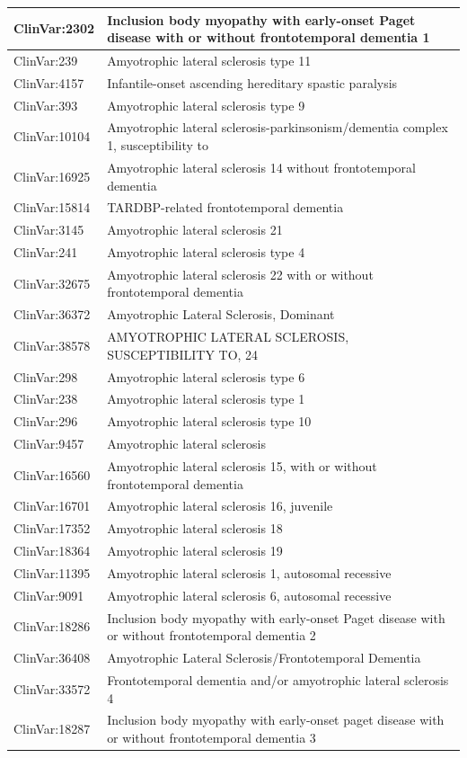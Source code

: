 \documentclass[9pt,a4paper,]{extarticle}
\begin{document}
\begin{table}
\begin{tabular}[t]{l|l}
\hline
ClinVar:2302 & Inclusion body myopathy with early-onset Paget disease with or without frontotemporal dementia 1\\
\hline
ClinVar:239 & Amyotrophic lateral sclerosis type 11\\
\hline
ClinVar:4157 & Infantile-onset ascending hereditary spastic paralysis\\
\hline
ClinVar:393 & Amyotrophic lateral sclerosis type 9\\
\hline
ClinVar:10104 & Amyotrophic lateral sclerosis-parkinsonism/dementia complex 1, susceptibility to\\
\hline
ClinVar:16925 & Amyotrophic lateral sclerosis 14 without frontotemporal dementia\\
\hline
ClinVar:15814 & TARDBP-related frontotemporal dementia\\
\hline
ClinVar:3145 & Amyotrophic lateral sclerosis 21\\
\hline
ClinVar:241 & Amyotrophic lateral sclerosis type 4\\
\hline
ClinVar:32675 & Amyotrophic lateral sclerosis 22 with or without frontotemporal dementia\\
\hline
ClinVar:36372 & Amyotrophic Lateral Sclerosis, Dominant\\
\hline
ClinVar:38578 & AMYOTROPHIC LATERAL SCLEROSIS, SUSCEPTIBILITY TO, 24\\
\hline
ClinVar:298 & Amyotrophic lateral sclerosis type 6\\
\hline
ClinVar:238 & Amyotrophic lateral sclerosis type 1\\
\hline
ClinVar:296 & Amyotrophic lateral sclerosis type 10\\
\hline
ClinVar:9457 & Amyotrophic lateral sclerosis\\
\hline
ClinVar:16560 & Amyotrophic lateral sclerosis 15, with or without frontotemporal dementia\\
\hline
ClinVar:16701 & Amyotrophic lateral sclerosis 16, juvenile\\
\hline
ClinVar:17352 & Amyotrophic lateral sclerosis 18\\
\hline
ClinVar:18364 & Amyotrophic lateral sclerosis 19\\
\hline
ClinVar:11395 & Amyotrophic lateral sclerosis 1, autosomal recessive\\
\hline
ClinVar:9091 & Amyotrophic lateral sclerosis 6, autosomal recessive\\
\hline
ClinVar:18286 & Inclusion body myopathy with early-onset Paget disease with or without frontotemporal dementia 2\\
\hline
ClinVar:36408 & Amyotrophic Lateral Sclerosis/Frontotemporal Dementia\\
\hline
ClinVar:33572 & Frontotemporal dementia and/or amyotrophic lateral sclerosis 4\\
\hline
ClinVar:18287 & Inclusion body myopathy with early-onset paget disease with or without frontotemporal dementia 3\\
\hline
\end{tabular}
\end{table}
\end{document}

